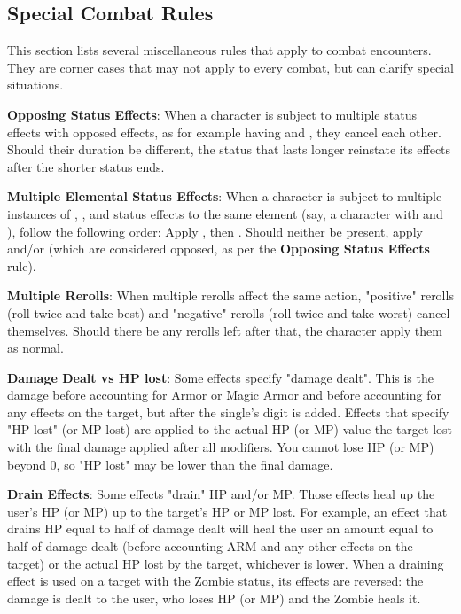 \begin{multicols}{2}
\subsection{Special Combat Rules}\label{misccombat}
This section lists several miscellaneous rules that apply to combat encounters. They are corner cases that may not apply to every combat, but can clarify special situations.

\textbf{Opposing Status Effects}: When a character is subject to multiple status effects with opposed effects, as for example having  and , they cancel each other. Should their duration be different, the status that lasts longer reinstate its effects after the shorter status ends.

\textbf{Multiple Elemental Status Effects}: When a character is subject to multiple instances of , ,  and  status effects to the same element (say, a character with  and ), follow the following order: Apply , then . Should neither be present, apply  and/or  (which are considered opposed, as per the \textbf{Opposing Status Effects} rule).  

\textbf{Multiple Rerolls}: When multiple rerolls affect the same action, "positive" rerolls (roll twice and take best) and "negative" rerolls (roll twice and take worst) cancel themselves. Should there be any rerolls left after that, the character apply them as normal. 

\textbf{Damage Dealt vs HP lost}: Some effects specify "damage dealt". This is the damage before accounting for Armor or Magic Armor and before accounting for any effects on the target, but after the single's digit is added. Effects that specify "HP lost" (or MP lost) are applied to the actual HP (or MP) value the target lost with the final damage applied after all modifiers. You cannot lose HP (or MP) beyond 0, so "HP lost" may be lower than the final damage.

\textbf{Drain Effects}: Some effects "drain" HP and/or MP. Those effects heal up the user's HP (or MP) up to the target's HP or MP lost. For example, an effect that drains HP equal to half of damage dealt will heal the user an amount equal to half of damage dealt (before accounting ARM and any other effects on the target) or the actual HP lost by the target, whichever is lower. When a draining effect is used on a target with the Zombie status, its effects are reversed: the damage is dealt to the user, who loses HP (or MP) and the Zombie heals it.


\end{multicols}

